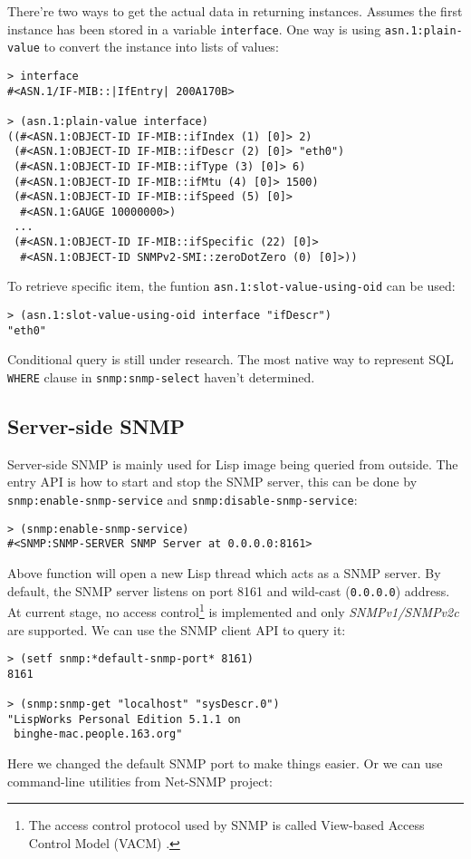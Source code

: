 \documentclass[reprint,natbib,9pt]{sigplanconf}
\begin{document}
There're two ways to get the actual data in returning instances. Assumes
the first instance has been stored in a variable \texttt{interface}. One
way is using \texttt{asn.1:plain-value} to convert the instance into lists
of values:
\begin{verbatim}
> interface
#<ASN.1/IF-MIB::|IfEntry| 200A170B>

> (asn.1:plain-value interface)
((#<ASN.1:OBJECT-ID IF-MIB::ifIndex (1) [0]> 2)
 (#<ASN.1:OBJECT-ID IF-MIB::ifDescr (2) [0]> "eth0")
 (#<ASN.1:OBJECT-ID IF-MIB::ifType (3) [0]> 6)
 (#<ASN.1:OBJECT-ID IF-MIB::ifMtu (4) [0]> 1500)
 (#<ASN.1:OBJECT-ID IF-MIB::ifSpeed (5) [0]>
  #<ASN.1:GAUGE 10000000>)
 ...
 (#<ASN.1:OBJECT-ID IF-MIB::ifSpecific (22) [0]>
  #<ASN.1:OBJECT-ID SNMPv2-SMI::zeroDotZero (0) [0]>))
\end{verbatim}
To retrieve specific item, the funtion \texttt{asn.1:slot-value-using-oid}
can be used:
\begin{verbatim}
> (asn.1:slot-value-using-oid interface "ifDescr")
"eth0"
\end{verbatim}

Conditional query is still under research. The most native way to
represent SQL \texttt{WHERE} clause in \texttt{snmp:snmp-select}
haven't determined.

\subsection{Server-side SNMP}

Server-side SNMP is mainly used for Lisp image being queried from
outside. The entry API is how to start and stop the SNMP server, this
can be done by \texttt{snmp:enable-snmp-service} and
\texttt{snmp:disable-snmp-service}:
\begin{verbatim}
> (snmp:enable-snmp-service)
#<SNMP:SNMP-SERVER SNMP Server at 0.0.0.0:8161>
\end{verbatim}
Above function will open a new Lisp thread which acts as a SNMP
server. By default, the SNMP server listens on port 8161 and
wild-cast (\texttt{0.0.0.0}) address. At current stage, no access
control\footnote{The access control protocol used by SNMP is called View-based Access Control Model (VACM) \cite{RFC:3415}.}
is implemented and only \textsl{SNMPv1/SNMPv2c} are
supported. We can use the SNMP client API to query it:
\begin{verbatim}
> (setf snmp:*default-snmp-port* 8161)
8161

> (snmp:snmp-get "localhost" "sysDescr.0")
"LispWorks Personal Edition 5.1.1 on
 binghe-mac.people.163.org"
\end{verbatim}
Here we changed the default SNMP port to make things easier. Or we can
use command-line utilities from Net-SNMP project:
\end{document}
